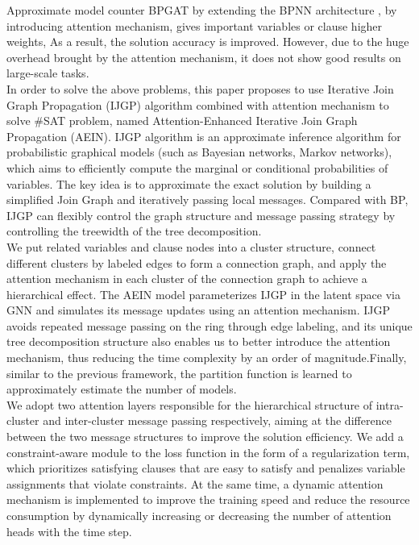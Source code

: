Approximate model counter BPGAT \cite{DBLP:conf/esann/Saveri22} by extending the BPNN architecture
\cite{DBLP:conf/nips/KuckCTLSSE20}, by introducing attention mechanism, gives important variables or clause 
higher weights, As a result, the solution accuracy is improved. However, due to the huge overhead brought 
by the attention mechanism, it does not show good results on large-scale tasks.\\

In order to solve the above problems, this paper proposes to use Iterative Join Graph Propagation (IJGP) 
\cite{DBLP:journals/corr/abs-1301-0564} algorithm combined with attention mechanism to solve \#SAT problem, 
named Attention-Enhanced Iterative Join Graph Propagation (AEIN). IJGP algorithm is an approximate inference 
algorithm for probabilistic graphical models (such as Bayesian networks, Markov networks), which aims to 
efficiently compute the marginal or conditional probabilities of variables. The key idea is to approximate 
the exact solution by building a simplified Join Graph and iteratively passing local messages. Compared with 
BP, IJGP can flexibly control the graph structure and message passing strategy by controlling the treewidth 
of the tree decomposition.\\

We put related variables and clause nodes into a cluster structure, connect different clusters by labeled 
edges to form a connection graph, and apply the attention mechanism in each cluster of the connection graph 
to achieve a hierarchical effect. The AEIN model parameterizes IJGP in the latent space via GNN and simulates 
its message updates using an attention mechanism. IJGP avoids repeated message passing on the ring through 
edge labeling, and its unique tree decomposition structure also enables us to better introduce the attention 
mechanism, thus reducing the time complexity by an order of magnitude.Finally, similar to the previous framework, 
the partition function is learned to approximately estimate the number of models.\\

We adopt two attention layers responsible for the hierarchical structure of intra-cluster and inter-cluster 
message passing respectively, aiming at the difference between the two message structures to improve the 
solution efficiency. We add a constraint-aware module to the loss function in the form of a regularization 
term, which prioritizes satisfying clauses that are easy to satisfy and penalizes variable assignments that 
violate constraints. At the same time, a dynamic attention mechanism is implemented to improve the training 
speed and reduce the resource consumption by dynamically increasing or decreasing the number of attention 
heads with the time step.\\

